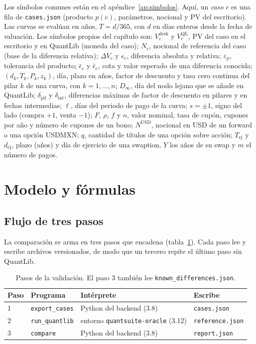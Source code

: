 Los símbolos comunes están en el apéndice~\ref{ap:simbolos}. Aquí, un \emph{caso} $c$ es una fila de
\texttt{cases.json} (producto $p(c)$, parámetros, nocional y PV del escritorio). Las curvas se evalúan en años,
$T = d/365$, con $d$ en días enteros desde la fecha de valuación. Los símbolos propios del capítulo son:
$V^{\mathrm{desk}}_c$ y $V^{\mathrm{QL}}_c$, PV del caso en el escritorio y en QuantLib (moneda del caso);
$N_c$, nocional de referencia del caso (base de la diferencia relativa); $\Delta V_c$ y $\epsilon_c$, diferencia
absoluta y relativa; $\varepsilon_p$, tolerancia del producto; $\bar\epsilon_c$ y $\hat\epsilon_c$, cota y valor
esperado de una diferencia conocida; $(d_k, T_k, P_k, z_k)$, día, plazo en años, factor de descuento y tasa cero
continua del pilar $k$ de una curva, con $k = 1,\dots,n$; $D_\infty$, día del nodo lejano que se añade en QuantLib;
$\delta_{\mathrm{pil}}$ y $\delta_{\mathrm{int}}$, diferencias máximas de factor de descuento en pilares y en fechas
intermedias; $\ell$, días del periodo de pago de la curva; $s = \pm 1$, signo del lado (compra $+1$, venta $-1$);
$F$, $\rho$, $f$ y $n$, valor nominal, tasa de cupón, cupones por año y número de cupones de un bono;
$N^{\mathrm{USD}}$, nocional en USD de un forward o una opción USDMXN; $q$, cantidad de títulos de una opción sobre acción;
$T_{\mathrm{ej}}$ y $d_{\mathrm{ej}}$, plazo (años) y día de ejercicio de una swaption, $Y$ los años de su swap y
$m$ el número de pagos.

\section{Modelo y fórmulas}\label{sec:cap12-modelo}

\subsection{Flujo de tres pasos}\label{sec:cap12-flujo}

La comparación se arma en tres pasos que encadena 
(tabla~\ref{tab:cap12-pasos}). Cada paso lee y escribe archivos versionados, de modo que un tercero repite el
último paso sin QuantLib.

\begin{table}[ht]
\centering
\begin{tabular}{@{}llll@{}}
\toprule
Paso & Programa & Intérprete & Escribe \\
\midrule
1 & \texttt{export\_cases} & Python del backend (3.8) & \texttt{cases.json} \\
2 & \texttt{run\_quantlib} & entorno \texttt{quantsuite-oracle} (3.12) & \texttt{reference.json} \\
3 & \texttt{compare} & Python del backend (3.8) & \texttt{report.json} \\
\bottomrule
\end{tabular}
\caption{Pasos de la validación. El paso 3 también lee \texttt{known\_differences.json}.}\label{tab:cap12-pasos}
\end{table}

